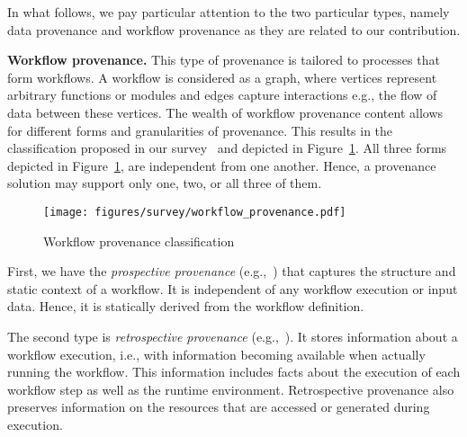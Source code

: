 \label{sec:prov-type}

In what follows, we pay particular attention to the two particular types, namely data provenance and workflow provenance as they are related to our contribution.




\smallskip

\noindent \textbf{Workflow provenance.} 
This type of provenance is tailored to processes that form workflows.
A workflow is considered as a graph, where vertices represent arbitrary functions or modules and edges capture interactions e.g., the flow of data between these vertices. 
The wealth of workflow provenance content allows for different forms and granularities of provenance. 
This results in the classification proposed in our survey~\cite{Herschel2017survey} and depicted in Figure~\ref{fig:workflow_provenance}.
All three forms depicted in Figure~\ref{fig:workflow_provenance}, are independent from one another. Hence, a provenance solution may support only one, two, or all three of them.
\begin{figure}[t]
\centering
\texttt{[image: figures/survey/workflow\_provenance.pdf]}
\caption{Workflow provenance classification~\cite{Herschel2017survey}}
\label{fig:workflow_provenance}
\end{figure}
First, we have the \emph{prospective provenance} (e.g.,~\cite{Alper2013, Dey2015}) that captures the structure and static context of a workflow. It is independent of any workflow execution or input data. Hence, it is statically derived from the workflow definition.

The second type is \emph{retrospective provenance} (e.g.,~\cite{Altintas2006,Tan2010,Murta14}). 
It stores information about a workflow execution, i.e., with information becoming available when actually running the workflow. 
This information includes facts about the execution of each workflow step as well as the runtime environment. Retrospective provenance also preserves information on the resources that are accessed or generated during execution. 

